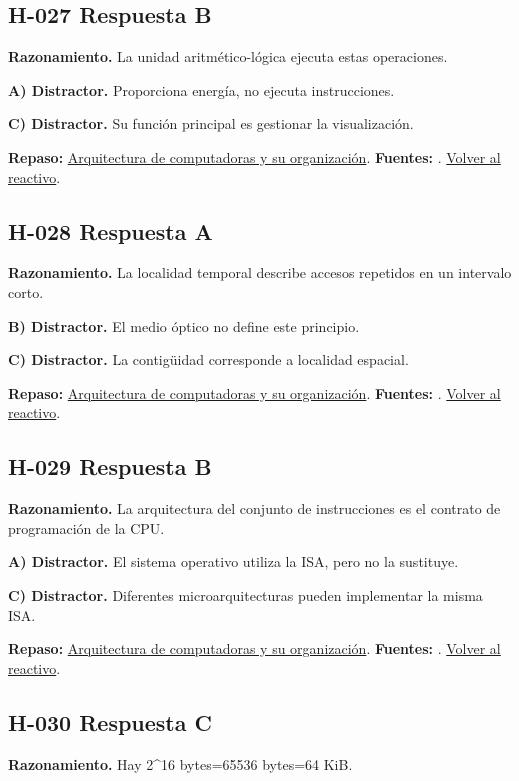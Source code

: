 \subsection*{H-027 \quad Respuesta B}\label{s:H-027}
\textbf{Razonamiento.} La unidad aritmético-lógica ejecuta estas operaciones.

\textbf{A) Distractor. }Proporciona energía, no ejecuta instrucciones.

\textbf{C) Distractor. }Su función principal es gestionar la visualización.

\textbf{Repaso:} \hyperref[sec:h2]{Arquitectura de computadoras y su organización}. \textbf{Fuentes:} \cite{intel,architecture}. \hyperref[q:H-027]{Volver al reactivo}.\par\medskip

\subsection*{H-028 \quad Respuesta A}\label{s:H-028}
\textbf{Razonamiento.} La localidad temporal describe accesos repetidos en un intervalo corto.

\textbf{B) Distractor. }El medio óptico no define este principio.

\textbf{C) Distractor. }La contigüidad corresponde a localidad espacial.

\textbf{Repaso:} \hyperref[sec:h2]{Arquitectura de computadoras y su organización}. \textbf{Fuentes:} \cite{intel,architecture}. \hyperref[q:H-028]{Volver al reactivo}.\par\medskip

\subsection*{H-029 \quad Respuesta B}\label{s:H-029}
\textbf{Razonamiento.} La arquitectura del conjunto de instrucciones es el contrato de programación de la CPU.

\textbf{A) Distractor. }El sistema operativo utiliza la ISA, pero no la sustituye.

\textbf{C) Distractor. }Diferentes microarquitecturas pueden implementar la misma ISA.

\textbf{Repaso:} \hyperref[sec:h2]{Arquitectura de computadoras y su organización}. \textbf{Fuentes:} \cite{intel,architecture}. \hyperref[q:H-029]{Volver al reactivo}.\par\medskip

\subsection*{H-030 \quad Respuesta C}\label{s:H-030}
\textbf{Razonamiento.} Hay 2\textasciicircum{}16 bytes=65536 bytes=64 KiB.

